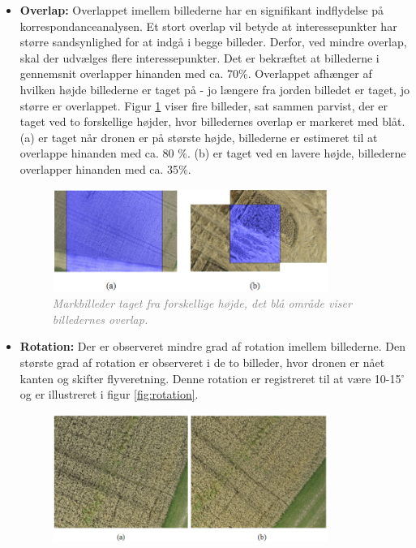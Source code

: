 \begin{itemize}
\item{\textbf{Overlap:} Overlappet imellem billederne har en signifikant indflydelse på korrespondanceanalysen. Et stort overlap vil betyde at interessepunkter har større sandsynlighed for at indgå i begge billeder. Derfor, ved mindre overlap, skal der udvælges flere interessepunkter. Det er bekræftet at billederne i gennemsnit overlapper hinanden med ca. 70\%. Overlappet afhænger af hvilken højde billederne er taget på - jo længere fra jorden billedet er taget, jo større er overlappet. Figur \ref{fig:overlap} viser fire billeder, sat sammen parvist, der er taget ved to forskellige højder, hvor billedernes overlap er markeret med blåt. (a) er taget når dronen er på største højde, billederne er estimeret til at overlappe hinanden med ca. 80 $\%$. (b) er taget ved en lavere højde, billederne overlapper hinanden med ca. 35$\%$.
\begin{figure}[H]
    \centering
    \includegraphics[width=0.85\textwidth]{fig/17.png}
     \vspace{-1em}
    \begin{center}    
       \caption{\textcolor{gray}{\footnotesize \textit{Markbilleder taget fra forskellige højde, det blå område viser billedernes overlap.}}}
    \label{fig:overlap}
     \end{center}
     \vspace{-2.5em}
  \end{figure} \noindent }
\item{\textbf{Rotation:} Der er observeret mindre grad af rotation imellem billederne.
Den største grad af rotation er observeret i de to billeder, hvor dronen er nået kanten og skifter flyveretning. Denne rotation er registreret til at være 10-15$^{\circ}$ og er illustreret i figur \ref{fig:rotation}.
\begin{figure}[H]
    \centering
    \includegraphics[width=0.85\textwidth]{fig/19.png}

\end{figure}}
\end{itemize}
